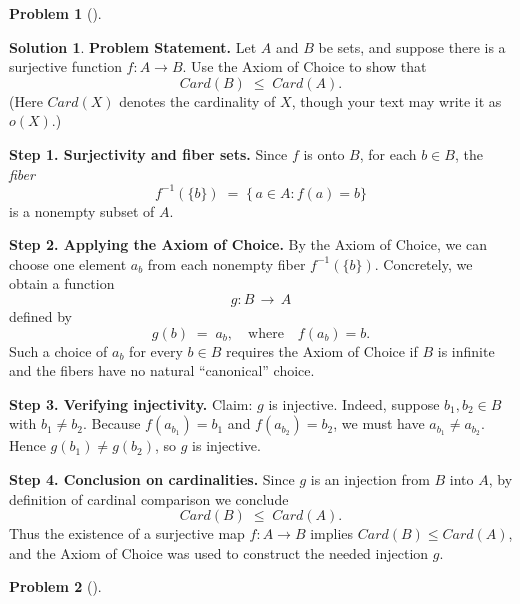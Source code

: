 \documentclass[12pt]{article}
\theoremstyle{definition} %
\newtheorem{solution}{Solution}
\newtheorem{problem}{Problem}
\theoremstyle{plain} %
\begin{document}
\begin{problem}[]
    
\end{problem}
\begin{solution}

    \noindent
    \textbf{Problem Statement.}
    Let $A$ and $B$ be sets, and suppose there is a surjective function 
    $f\colon A \to B$.  Use the Axiom of Choice to show that 
    \[
    Card(B) \; \le \; Card(A).
    \]
    (Here $Card(X)$ denotes the cardinality of $X$, 
    though your text may write it as $o(X)$.)
    
    \bigskip
    \noindent
    \textbf{Step 1.  Surjectivity and fiber sets.}  
    Since $f$ is onto $B$, for each $b \in B$, the \emph{fiber} 
    \[
    f^{-1}(\{b\}) \;=\; \{\,a \in A : f(a) = b\}
    \]
    is a nonempty subset of $A$.
    
    \medskip
    \noindent
    \textbf{Step 2.  Applying the Axiom of Choice.}  
    By the Axiom of Choice, we can choose one element $a_b$ from each nonempty fiber 
    $f^{-1}(\{b\})$.  Concretely, we obtain a function 
    \[
    g\colon B \,\longrightarrow\, A
    \]
    defined by 
    \[
    g(b) \;=\; a_b,\quad\text{where}\quad f(a_b) = b.
    \]
    Such a choice of $a_b$ for every $b \in B$ requires the Axiom of Choice 
    if $B$ is infinite and the fibers have no natural ``canonical'' choice.
    
    \medskip
    \noindent
    \textbf{Step 3.  Verifying injectivity.}  
    Claim: $g$ is injective.  Indeed, suppose $b_1,b_2 \in B$ with $b_1 \neq b_2$. 
    Because $f(a_{b_1}) = b_1$ and $f(a_{b_2}) = b_2$, we must have 
    $a_{b_1} \neq a_{b_2}$.  Hence $g(b_1) \neq g(b_2)$, so $g$ is injective.
    
    \medskip
    \noindent
    \textbf{Step 4.  Conclusion on cardinalities.}  
    Since $g$ is an injection from $B$ into $A$, 
    by definition of cardinal comparison we conclude 
    \[
    Card(B) \;\le\; Card(A).
    \]
    Thus the existence of a surjective map $f\colon A \to B$ 
    implies $Card(B) \le Card(A)$, and the Axiom of Choice 
    was used to construct the needed injection $g$.
     
\end{solution}
\begin{problem}[]
    
\end{problem}
\end{document}
